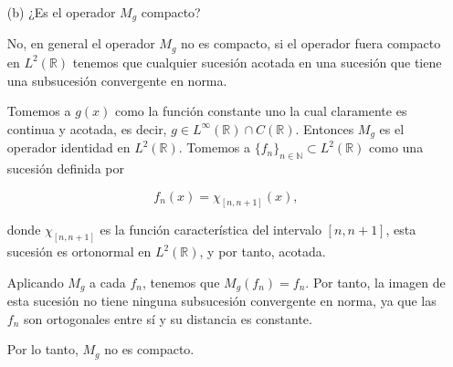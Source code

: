 \begin{itemize}
\begin{proof}
lo cual contradice la desigualdad anterior cuando $\varepsilon \to 0$. Por tanto, $\lambda \in \sigma(M_g)$. Como el espectro $\sigma(M_g)$ es cerrado, se concluye que,

\[
\overline{\{g(x) : x \in \mathbb{R}\}} \subseteq \sigma(M_g).
\]

Por otro lado, sea \( \lambda \in \mathbb{C} \setminus \overline{g(\mathbb{R})} \). Entonces existe \( \varepsilon > 0 \) tal que \( |g(x) - \lambda| \geq \varepsilon \) para todo \( x \in \mathbb{R} \), definamos el operador
\[
R_\lambda(f)(x) = \frac{f(x)}{g(x) - \lambda},
\]
que es acotado porque,

\[
\left\| R_\lambda(f) \right\|_{L^2}^2 = \int_{\mathbb{R}} \left| \frac{f(x)}{g(x) - \lambda} \right|^2 dx \leq \frac{1}{\varepsilon^2} \|f\|_{L^2}^2.
\]

y satisface que
\[
(M_g - \lambda I) R_\lambda(f)(x) = (g(x) - \lambda)\cdot \frac{f(x)}{g(x) - \lambda} = f(x).
\]
lo cual implica que \( (M_g - \lambda I)^{-1} \) existe y es acotado, por lo tanto \( \lambda \notin \sigma(M_g) \), por lo que 
\[
\sigma(M_g) \subseteq \overline{g(\mathbb{R})}
\]
Así,
\[
\sigma(M_g) = \overline{g(\mathbb{R})}
\]
\end{proof}
\item[(b)] ¿Es el operador $M_g$ compacto? 
\begin{sol}
No, en general el operador \( M_g \) no es compacto, si el operador fuera compacto en \( L^2(\mathbb{R}) \) tenemos que cualquier sucesión acotada en una sucesión que tiene una subsucesión convergente en norma.

Tomemos a $g(x)$ como la función constante uno la cual claramente es continua y acotada, es decir, \( g \in L^\infty(\mathbb{R}) \cap C(\mathbb{R}) \). Entonces \( M_g \) es el operador identidad en \( L^2(\mathbb{R}) \). Tomemos a  \( \{f_n\}_{n \in \mathbb{N}} \subset L^2(\mathbb{R}) \) como una sucesión definida por

\[
f_n(x) = \chi_{[n, n+1]}(x),
\]

donde \( \chi_{[n,n+1]} \) es la función característica del intervalo \( [n, n+1] \), esta sucesión es ortonormal en \( L^2(\mathbb{R}) \), y por tanto, acotada.

Aplicando \( M_g \) a cada \( f_n \), tenemos que \( M_g(f_n) = f_n \). Por tanto, la imagen de esta sucesión no tiene ninguna subsucesión convergente en norma, ya que las \( f_n \) son ortogonales entre sí y su distancia es constante.

Por lo tanto, \( M_g \) no es compacto.
\end{sol}

\end{itemize}
